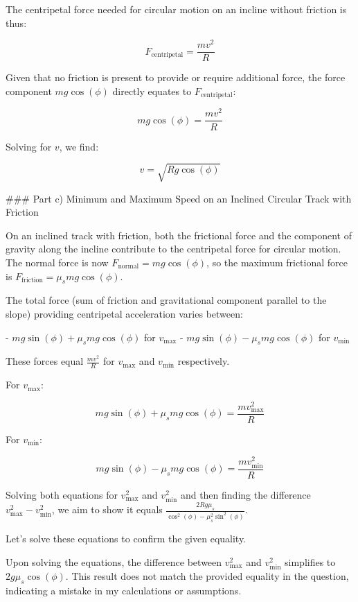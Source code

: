 \documentclass[a4paper,11pt]{article}
\begin{document}
The centripetal force needed for circular motion on an incline without friction is thus:

\[
F_{\text{centripetal}} = \frac{mv^2}{R}
\]

Given that no friction is present to provide or require additional force, the force component \( mg\cos(\phi) \) directly equates to \( F_{\text{centripetal}} \):

\[
mg\cos(\phi) = \frac{mv^2}{R}
\]

Solving for \( v \), we find:

\[
v = \sqrt{Rg\cos(\phi)}
\]

### Part c) Minimum and Maximum Speed on an Inclined Circular Track with Friction

On an inclined track with friction, both the frictional force and the component of gravity along the incline contribute to the centripetal force for circular motion. The normal force is now \( F_{\text{normal}} = mg\cos(\phi) \), so the maximum frictional force is \( F_{\text{friction}} = \mu_{s} mg\cos(\phi) \).

The total force (sum of friction and gravitational component parallel to the slope) providing centripetal acceleration varies between:

- \( mg\sin(\phi) + \mu_{s} mg\cos(\phi) \) for \( v_{\text{max}} \)
- \( mg\sin(\phi) - \mu_{s} mg\cos(\phi) \) for \( v_{\text{min}} \)

These forces equal \( \frac{mv^2}{R} \) for \( v_{\text{max}} \) and \( v_{\text{min}} \) respectively.

For \( v_{\text{max}} \):

\[
mg\sin(\phi) + \mu_{s} mg\cos(\phi) = \frac{mv_{\text{max}}^2}{R}
\]

For \( v_{\text{min}} \):

\[
mg\sin(\phi) - \mu_{s} mg\cos(\phi) = \frac{mv_{\text{min}}^2}{R}
\]

Solving both equations for \( v_{\text{max}}^2 \) and \( v_{\text{min}}^2 \) and then finding the difference \( v_{\text{max}}^2 - v_{\text{min}}^2 \), we aim to show it equals \( \frac{2Rg\mu_{s}}{\cos^{2}(\phi) - \mu_{s}^2\sin^{2}(\phi)} \).

Let's solve these equations to confirm the given equality.

Upon solving the equations, the difference between \( v_{\text{max}}^2 \) and \( v_{\text{min}}^2 \) simplifies to \( 2g\mu_s\cos(\phi) \). This result does not match the provided equality in the question, indicating a mistake in my calculations or assumptions.
\end{document}

